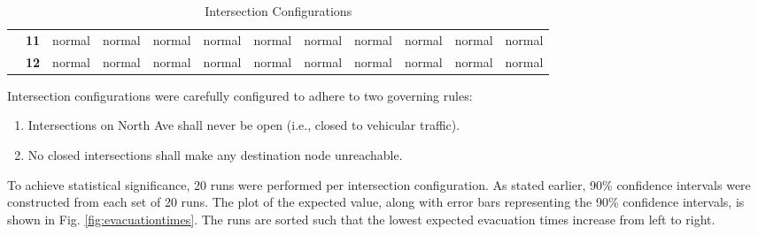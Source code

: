 \documentclass[12pt]{article}
\begin{document}
\begin{table}[]
{\begin{tabular}{clllllllllll}
			\multicolumn{1}{c|}{}                                   & \multicolumn{1}{l|}{\textbf{11}} & \multicolumn{1}{l|}{\cellcolor[HTML]{FFFC9E}normal} & \multicolumn{1}{l|}{\cellcolor[HTML]{FFFC9E}normal} & \multicolumn{1}{l|}{\cellcolor[HTML]{FFFC9E}normal} & \multicolumn{1}{l|}{\cellcolor[HTML]{FFFC9E}normal} & \multicolumn{1}{l|}{\cellcolor[HTML]{FFFC9E}normal} & \multicolumn{1}{l|}{\cellcolor[HTML]{FFFC9E}normal} & \multicolumn{1}{l|}{\cellcolor[HTML]{FFFC9E}normal} & \multicolumn{1}{l|}{\cellcolor[HTML]{FFFC9E}normal} & \multicolumn{1}{l|}{\cellcolor[HTML]{FFFC9E}normal} & \multicolumn{1}{l|}{\cellcolor[HTML]{FFFC9E}normal} \\ \cline{2-12}
			\multicolumn{1}{c|}{\multirow{-12}{*}{\rotatebox{90}{Intersection ID}}} & \multicolumn{1}{l|}{\textbf{12}} & \multicolumn{1}{l|}{\cellcolor[HTML]{FFFC9E}normal} & \multicolumn{1}{l|}{\cellcolor[HTML]{FFFC9E}normal} & \multicolumn{1}{l|}{\cellcolor[HTML]{FFFC9E}normal} & \multicolumn{1}{l|}{\cellcolor[HTML]{FFFC9E}normal} & \multicolumn{1}{l|}{\cellcolor[HTML]{FFFC9E}normal} & \multicolumn{1}{l|}{\cellcolor[HTML]{FFFC9E}normal} & \multicolumn{1}{l|}{\cellcolor[HTML]{FFFC9E}normal} & \multicolumn{1}{l|}{\cellcolor[HTML]{FFFC9E}normal} & \multicolumn{1}{l|}{\cellcolor[HTML]{FFFC9E}normal} & \multicolumn{1}{l|}{\cellcolor[HTML]{FFFC9E}normal} \\ \cline{2-12}
		\end{tabular}%
	}
	\caption{Intersection Configurations}
	\label{table:configs}
\end{table}

Intersection configurations were carefully configured to adhere to two governing
rules:

\begin{enumerate}
  \item Intersections on North Ave shall never be open (i.e., closed to vehicular
traffic).
  \item No closed intersections shall make any destination node unreachable.
\end{enumerate}

To achieve statistical significance, 20 runs were performed per intersection
configuration.  As stated earlier, 90\% confidence intervals were constructed
from each set of 20 runs.  The plot of the expected value, along with error
bars representing the 90\% confidence intervals, is shown in Fig.
\ref{fig:evacuationtimes}.  The runs are sorted such that the lowest expected
evacuation times increase from left to right.
\end{document}
